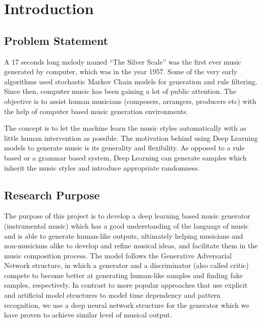 \documentclass[12pt,oneside]{chicagocapstone}
\begin{document}
  \listoffigures

  \listoftables


\mainmatter %
\pagestyle{fancyplain} %

\hypertarget{introduction}{%
\chapter*{Introduction}\label{introduction}}

\hypertarget{problem-statement}{%
\section*{Problem Statement}\label{problem-statement}}

A 17 seconds long melody named ``The Silver Scale'' was the first ever music generated by computer, which was in the year 1957. Some of the very early algorithms used stochastic Markov Chain models for generation and rule filtering. Since then, computer music has been gaining a lot of public attention. The objective is to assist human musicians (composers, arrangers, producers etc) with the help of computer based music generation environments.

The concept is to let the machine learn the music styles automatically with as little human intervention as possible. The motivation behind using Deep Learning models to generate music is its generality and flexibility. As opposed to a rule based or a grammar based system, Deep Learning can generate samples which inherit the music styles and introduce appropriate randomness.

\hypertarget{research-purpose}{%
\section*{Research Purpose}\label{research-purpose}}

The purpose of this project is to develop a deep learning based music generator (instrumental music) which has a good understanding of the language of music and is able to generate human-like outputs, ultimately helping musicians and non-musicians alike to develop and refine musical ideas, and facilitate them in the music composition process. The model follows the Generative Adversarial Network structure, in which a generator and a discriminator (also called critic) compete to become better at generating human-like samples and finding fake samples, respectively. In contrast to more popular approaches that use explicit and artificial model structures to model time dependency and pattern recognition, we use a deep neural network structure for the generator which we have proven to achieve similar level of musical output.
\end{document}

